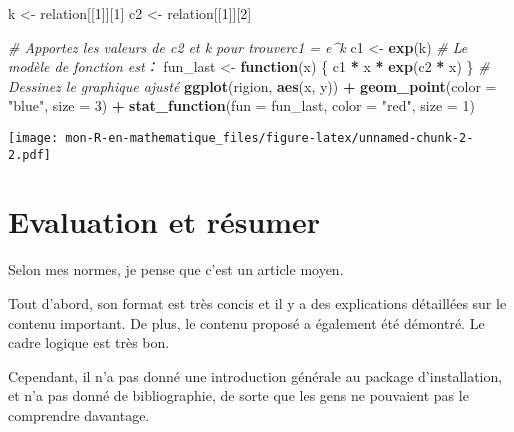 \documentclass[
]{article}
\newenvironment{Shaded}{\begin{snugshade}}{\end{snugshade}}
\newcommand{\CommentTok}[1]{\textcolor[rgb]{0.56,0.35,0.01}{\textit{#1}}}
\newcommand{\ControlFlowTok}[1]{\textcolor[rgb]{0.13,0.29,0.53}{\textbf{#1}}}
\newcommand{\DataTypeTok}[1]{\textcolor[rgb]{0.13,0.29,0.53}{#1}}
\newcommand{\DecValTok}[1]{\textcolor[rgb]{0.00,0.00,0.81}{#1}}
\newcommand{\KeywordTok}[1]{\textcolor[rgb]{0.13,0.29,0.53}{\textbf{#1}}}
\newcommand{\NormalTok}[1]{#1}
\newcommand{\OperatorTok}[1]{\textcolor[rgb]{0.81,0.36,0.00}{\textbf{#1}}}
\newcommand{\StringTok}[1]{\textcolor[rgb]{0.31,0.60,0.02}{#1}}
\begin{document}
\begin{Shaded}
\begin{Highlighting}[]
\NormalTok{k <-}\StringTok{ }\NormalTok{relation[[}\DecValTok{1}\NormalTok{]][}\DecValTok{1}\NormalTok{]}
\NormalTok{c2 <-}\StringTok{ }\NormalTok{relation[[}\DecValTok{1}\NormalTok{]][}\DecValTok{2}\NormalTok{]}
 
\CommentTok{# Apportez les valeurs de c2 et k pour trouverc1 = e^k}
\NormalTok{c1 <-}\StringTok{ }\KeywordTok{exp}\NormalTok{(k)}
\CommentTok{# Le modèle de fonction est：}
\NormalTok{fun_last <-}\StringTok{ }\ControlFlowTok{function}\NormalTok{(x) \{}
\NormalTok{    c1 }\OperatorTok{*}\StringTok{ }\NormalTok{x }\OperatorTok{*}\StringTok{ }\KeywordTok{exp}\NormalTok{(c2 }\OperatorTok{*}\StringTok{ }\NormalTok{x)}
\NormalTok{\}}
\CommentTok{# Dessinez le graphique ajusté}
 \KeywordTok{ggplot}\NormalTok{(rigion, }\KeywordTok{aes}\NormalTok{(x, y)) }\OperatorTok{+}\StringTok{ }\KeywordTok{geom_point}\NormalTok{(}\DataTypeTok{color =} \StringTok{"blue"}\NormalTok{, }\DataTypeTok{size =} \DecValTok{3}\NormalTok{) }\OperatorTok{+}\StringTok{ }\KeywordTok{stat_function}\NormalTok{(}\DataTypeTok{fun =}\NormalTok{ fun_last, }\DataTypeTok{color =} \StringTok{"red"}\NormalTok{, }\DataTypeTok{size =} \DecValTok{1}\NormalTok{)}
\end{Highlighting}
\end{Shaded}

\texttt{[image: mon-R-en-mathematique\_files/figure-latex/unnamed-chunk-2-2.pdf]}

\hypertarget{evaluation-et-ruxe9sumer}{%
\section{Evaluation et résumer}\label{evaluation-et-ruxe9sumer}}

Selon mes normes, je pense que c'est un article moyen.

Tout d'abord, son format est très concis et il y a des explications
détaillées sur le contenu important. De plus, le contenu proposé a
également été démontré. Le cadre logique est très bon.

Cependant, il n'a pas donné une introduction générale au package
d'installation, et n'a pas donné de bibliographie, de sorte que les gens
ne pouvaient pas le comprendre davantage.
\end{document}
